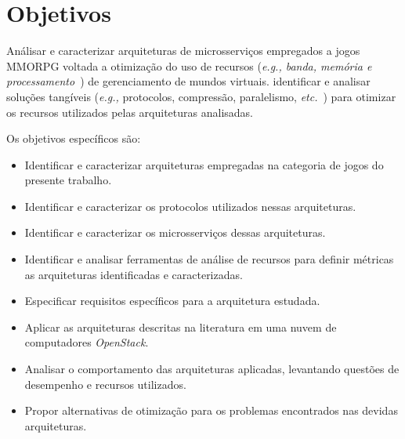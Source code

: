 \section{Objetivos}
\label{obj}

Análisar e caracterizar arquiteturas de microsserviços empregados a jogos \ac{MMORPG} voltada a otimização do uso de recursos (\textit{\textit{e.g.,} banda, memória e processamento}~\cite{1417630}) de gerenciamento de mundos virtuais.
%
identificar e analisar soluções tangíveis (\textit{e.g.,} protocolos, compressão, paralelismo, \textit{etc.}~\cite{1417630}) para otimizar os recursos utilizados pelas arquiteturas analisadas.

Os objetivos específicos são:
\begin{itemize}
    \item Identificar e caracterizar arquiteturas empregadas na categoria de jogos do presente trabalho.
    \item Identificar e caracterizar os protocolos utilizados nessas arquiteturas.
    \item Identificar e caracterizar os microsserviços dessas arquiteturas.
    \item Identificar e analisar ferramentas de análise de recursos para definir métricas as arquiteturas identificadas e caracterizadas.
    \item Especificar requisitos específicos para a arquitetura estudada.
    \item Aplicar as arquiteturas descritas na literatura em uma nuvem de computadores \textit{OpenStack}.
    \item Analisar o comportamento das arquiteturas aplicadas, levantando questões de desempenho e recursos utilizados.
    \item Propor alternativas de otimização para os problemas encontrados nas devidas arquiteturas.
\end{itemize}
